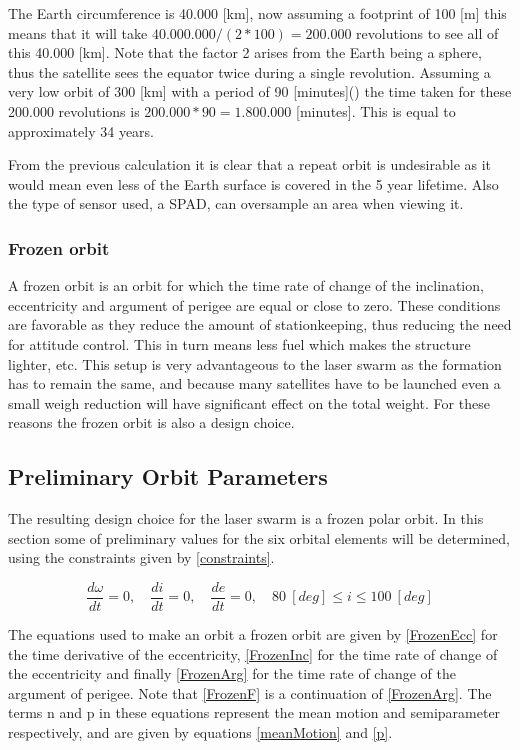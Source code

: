 The Earth circumference is 40.000 [km], now assuming a footprint of 100 [m] this means that it will take $40.000.000/(2*100)=200.000$ revolutions to see all of this 40.000 [km]. Note that the factor 2 arises from the Earth being a sphere, thus the satellite sees the equator twice during a single revolution. Assuming a very low orbit of 300 [km] with a period of 90 [minutes](\cite{larson}) the time taken for these 200.000 revolutions is $200.000*90=1.800.000$ [minutes]. This is equal to approximately 34 years.

From the previous calculation it is clear that a repeat orbit is undesirable as it would mean even less of the Earth surface is covered in the 5 year lifetime. Also the type of sensor used, a \ac{SPAD}, can oversample an area when viewing it.

\subsubsection{Frozen orbit}
A frozen orbit is an orbit for which the time rate of change of the inclination, eccentricity and argument of perigee are equal or close to zero. These conditions are favorable as they reduce the amount of stationkeeping, thus reducing the need for attitude control. This in turn means less fuel which makes the structure lighter, etc.
This setup is very advantageous to the laser swarm as the formation has to remain the same, and because many satellites have to be launched even a small weigh reduction will have significant effect on the total weight. For these reasons the frozen orbit is also a design choice.

\subsection{Preliminary Orbit Parameters}
The resulting design choice for the laser swarm is a frozen polar orbit. In this section some of preliminary values for the six orbital elements will be determined, using the constraints given by \ref{constraints}.

\begin{equation}
\frac{{d\omega }}{{dt}} = 0,\quad \frac{{di }}{{dt}} = 0,\quad \frac{{de }}{{dt}} = 0,\quad 80\ [deg] \leq i \leq 100\ [deg]
\label{constraints}
\end{equation}

The equations used to make an orbit a frozen orbit are given by \ref{FrozenEcc} for the time derivative of the eccentricity, \ref{FrozenInc} for the time rate of change of the eccentricity and finally \ref{FrozenArg} for the time rate of change of the argument of perigee. Note that \ref{FrozenF} is a continuation of \ref{FrozenArg}. The terms n and p in these equations represent the mean motion and semiparameter respectively, and are given by equations \ref{meanMotion} and \ref{p}.

